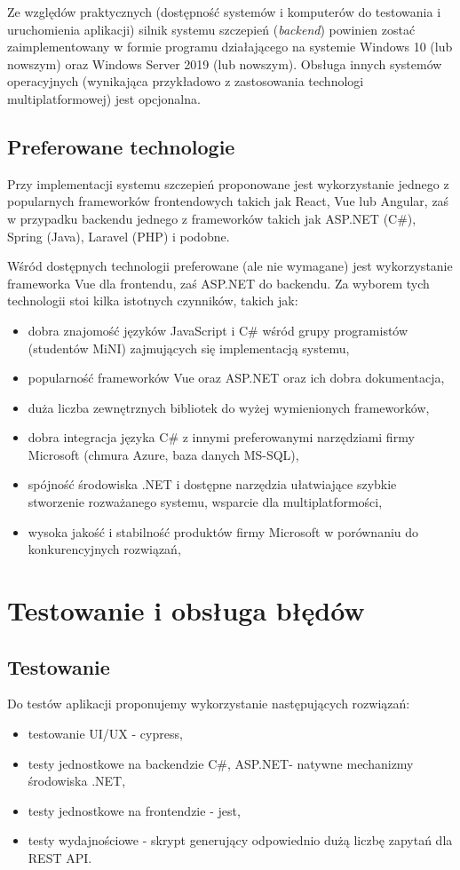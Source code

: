 \documentclass[a4paper,12pt,polish]{article}
\begin{document}
Ze względów praktycznych (dostępność systemów i komputerów do testowania i uruchomienia aplikacji) silnik systemu szczepień (\textit{backend}) powinien zostać zaimplementowany w formie programu działającego na systemie Windows 10 (lub nowszym) oraz Windows Server 2019 (lub nowszym). Obsługa innych systemów operacyjnych (wynikająca przykładowo z zastosowania technologi multiplatformowej) jest opcjonalna.

\subsection{Preferowane technologie}
Przy implementacji systemu szczepień proponowane jest wykorzystanie jednego z popularnych frameworków frontendowych takich jak React, Vue lub Angular, zaś w przypadku backendu jednego z frameworków takich jak ASP.NET (C\#), Spring (Java), Laravel (PHP) i podobne. 

Wśród dostępnych technologii preferowane (ale nie wymagane) jest wykorzystanie frameworka Vue dla frontendu, zaś ASP.NET do backendu. Za wyborem tych technologii stoi kilka istotnych czynników, takich jak:
\begin{itemize}
    \item dobra znajomość języków JavaScript i C\# wśród grupy programistów (studentów MiNI) zajmujących się implementacją systemu,
    \item popularność frameworków Vue oraz ASP.NET oraz ich dobra dokumentacja,
    \item duża liczba zewnętrznych bibliotek do wyżej wymienionych frameworków,
    \item dobra integracja języka C\# z innymi preferowanymi narzędziami firmy Microsoft (chmura Azure, baza danych MS-SQL),
    \item spójność środowiska .NET i dostępne narzędzia ułatwiające szybkie stworzenie rozważanego systemu, wsparcie dla multiplatformości,
    \item wysoka jakość i stabilność produktów firmy Microsoft w porównaniu do konkurencyjnych rozwiązań,
\end{itemize}

\newpage

\section{Testowanie i obsługa błędów}
\subsection{Testowanie}
Do testów aplikacji proponujemy wykorzystanie następujących rozwiązań:
\begin{itemize}
    \item testowanie UI/UX - cypress,
    \item testy jednostkowe na backendzie C\#, ASP.NET- natywne mechanizmy środowiska .NET,
    \item testy jednostkowe na frontendzie - jest,
    \item testy wydajnościowe - skrypt generujący odpowiednio dużą liczbę zapytań dla REST API.
\end{itemize}
\end{document}
